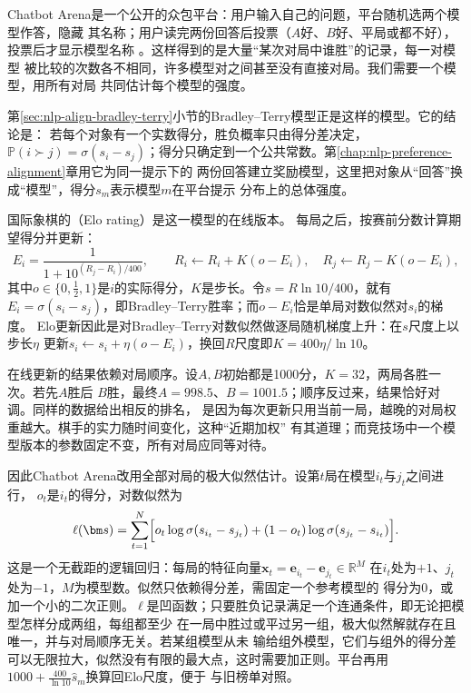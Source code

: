 Chatbot Arena是一个公开的众包平台：用户输入自己的问题，平台随机选两个模型作答，隐藏
其名称；用户读完两份回答后投票（$A$好、$B$好、平局或都不好），投票后才显示模型名称
。这样得到的是大量“某次对局中谁胜”的记录，每一对模型
被比较的次数各不相同，许多模型对之间甚至没有直接对局。我们需要一个模型，用所有对局
共同估计每个模型的强度。

第\ref{sec:nlp-align-bradley-terry}小节的Bradley--Terry模型正是这样的模型。它的结论是：
若每个对象有一个实数得分，胜负概率只由得分差决定，
$\mathbb P(i\succ j)=\sigma(s_i-s_j)$；得分只确定到一个公共常数。第\ref{chap:nlp-preference-alignment}章用它为同一提示下的
两份回答建立奖励模型，这里把对象从“回答”换成“模型”，得分$s_m$表示模型$m$在平台提示
分布上的总体强度。

国际象棋的（Elo rating）是这一模型的在线版本。
每局之后，按赛前分数计算期望得分并更新：
\begin{equation}
 E_i=\frac{1}{1+10^{(R_j-R_i)/400}},\qquad
 R_i\gets R_i+K(o-E_i),\quad R_j\gets R_j-K(o-E_i),
 \label{eq:nlp-eval-elo}
\end{equation}
其中$o\in\{0,\tfrac12,1\}$是$i$的实际得分，$K$是步长。令$s=R\ln10/400$，就有
$E_i=\sigma(s_i-s_j)$，即Bradley--Terry胜率；而$o-E_i$恰是单局对数似然对$s_i$的梯度。
Elo更新因此是对Bradley--Terry对数似然做逐局随机梯度上升：在$s$尺度上以步长$\eta$
更新$s_i\gets s_i+\eta(o-E_i)$，换回$R$尺度即$K=400\eta/\ln10$。

在线更新的结果依赖对局顺序。设$A,B$初始都是1000分，$K=32$，两局各胜一次。若先$A$胜后
$B$胜，最终$A=998.5$、$B=1001.5$；顺序反过来，结果恰好对调。同样的数据给出相反的排名，
是因为每次更新只用当前一局，越晚的对局权重越大。棋手的实力随时间变化，这种“近期加权”
有其道理；而竞技场中一个模型版本的参数固定不变，所有对局应同等对待。

因此Chatbot Arena改用全部对局的极大似然估计。设第$t$局在模型$i_t$与$j_t$之间进行，
$o_t$是$i_t$的得分，对数似然为
\begin{equation}
 \ell(\bm s)=\sum_{t=1}^{N}\Bigl[o_t\log\sigma(s_{i_t}-s_{j_t})
 +(1-o_t)\log\sigma(s_{j_t}-s_{i_t})\Bigr].
 \label{eq:nlp-eval-bt-likelihood}
\end{equation}
这是一个无截距的逻辑回归：每局的特征向量$\bm x_t=\bm e_{i_t}-\bm e_{j_t}\in\mathbb R^{M}$
在$i_t$处为$+1$、$j_t$处为$-1$，$M$为模型数。似然只依赖得分差，需固定一个参考模型的
得分为0，或加一个小的二次正则。$\ell$是凹函数；只要胜负记录满足一个连通条件，即无论把模型怎样分成两组，每组都至少
在一局中胜过或平过另一组，极大似然解就存在且唯一，并与对局顺序无关。若某组模型从未
输给组外模型，它们与组外的得分差可以无限拉大，似然没有有限的最大点，这时需要加正则。平台再用$1000+\frac{400}{\ln10}\hat s_m$换算回Elo尺度，便于
与旧榜单对照。


